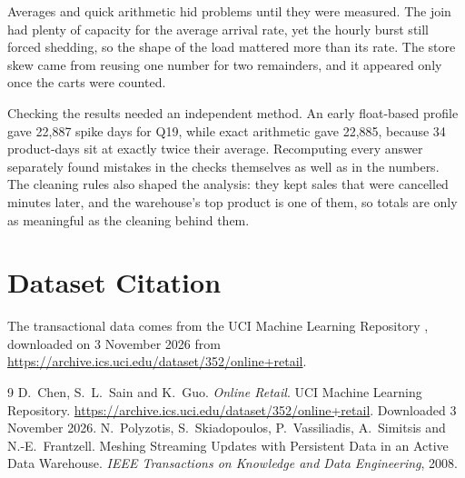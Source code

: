 \documentclass[11pt,a4paper]{article}
\begin{document}
Averages and quick arithmetic hid problems until they were measured. The join had plenty of capacity for the average arrival rate, yet the hourly burst still forced shedding, so the shape of the load mattered more than its rate. The store skew came from reusing one number for two remainders, and it appeared only once the carts were counted.

Checking the results needed an independent method. An early float-based profile gave 22,887 spike days for Q19, while exact arithmetic gave 22,885, because 34 product-days sit at exactly twice their average. Recomputing every answer separately found mistakes in the checks themselves as well as in the numbers. The cleaning rules also shaped the analysis: they kept sales that were cancelled minutes later, and the warehouse's top product is one of them, so totals are only as meaningful as the cleaning behind them.

\section{Dataset Citation}

The transactional data comes from the UCI Machine Learning Repository \cite{chen}, downloaded on 3 November 2026 from \url{https://archive.ics.uci.edu/dataset/352/online+retail}.

\begin{thebibliography}{9}
   D.~Chen, S.~L.~Sain and K.~Guo. \emph{Online Retail}. UCI Machine Learning Repository. \url{https://archive.ics.uci.edu/dataset/352/online+retail}. Downloaded 3 November 2026.
   N.~Polyzotis, S.~Skiadopoulos, P.~Vassiliadis, A.~Simitsis and N.-E.~Frantzell. Meshing Streaming Updates with Persistent Data in an Active Data Warehouse. \emph{IEEE Transactions on Knowledge and Data Engineering}, 2008.
\end{thebibliography}
\end{document}

